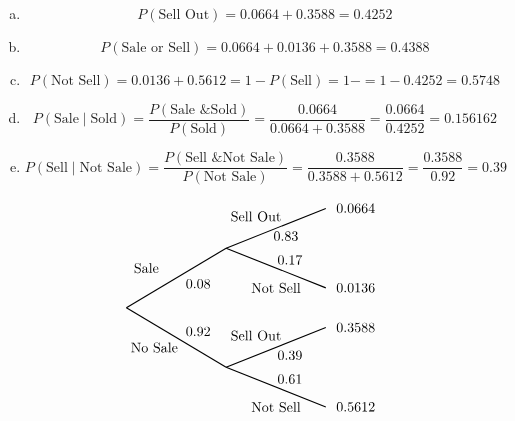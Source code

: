 \documentclass[11pt,letterpaper]{article}
\begin{document}
\sol 
\begin{enumerate}[(a)]
\item 
	\[
	P(\text{Sell Out})= 0.0664 + 0.3588= 0.4252
	\] \pspace

\item 
	\[
	P(\text{Sale or Sell})= 0.0664 + 0.0136 + 0.3588= 0.4388
	\] \pspace

\item 
	\[
	P(\text{Not Sell})= 0.0136 + 0.5612= 1 - P(\text{Sell})= 1 - = 1 - 0.4252= 0.5748
	\] \pspace

\item 
	\[
	P(\text{Sale} \;|\; \text{Sold})= \dfrac{P(\text{Sale \& Sold})}{P(\text{Sold})}= \dfrac{0.0664}{0.0664 + 0.3588}= \dfrac{0.0664}{0.4252}= 0.156162
	\] \pspace

\item 
	\[
	P(\text{Sell} \;|\; \text{Not Sale})= \dfrac{P(\text{Sell \& Not Sale})}{P(\text{Not Sale})}= \dfrac{0.3588}{0.3588 + 0.5612}= \dfrac{0.3588}{0.92}= 0.39
	\] 
\end{enumerate} \vfill

		\[
		\begin{tikzpicture}[scale= 1.0]
		\def\FirstUpLabel{Sale}
		\def\FirstDownLabel{No Sale}
		\def\SecondUpLabel{Sell Out}
		\def\SecondDownLabel{Not Sell}
		\def\Up{$0.08$}
		\def\Down{$0.92$}
		\def\UpUp{$0.83$}
		\def\UpDown{$0.17$}
		\def\DownUp{$0.39$}
		\def\DownDown{$0.61$}
		\def\first{$0.0664$}
		\def\second{$0.0136$}
		\def\third{$0.3588$}
		\def\fourth{$0.5612$}
		
		\node at (0.5,1) {\FirstUpLabel};	
		\node at (0.7,-1) {\FirstDownLabel};	
		\node at (1.8,0.6) {\Up};
		\node at (1.8,-0.6) {\Down};
		\draw[thick] (0,0) -- (2.5,1.5);
		\draw[thick] (0,0) -- (2.5,-1.5);
		
		\node at (3.25,2.3) {\SecondUpLabel};
		\node at (3.75,0.5) {\SecondDownLabel};
		\node at (4,1.8) {\UpUp};
		\node at (4.1,1.2) {\UpDown};
		\node at (5.75,2.5) {\first};
		\node at (5.75,0.5) {\second};
		\draw[thick] (2.5,1.5) -- (5,2.5);
		\draw[thick] (2.5,1.5) -- (5,0.5);

		\node at (3.25,-0.7) {\SecondUpLabel};
		\node at (3.75,-2.5) {\SecondDownLabel};
		\node at (4.1,-1.2) {\DownUp};
		\node at (4.1,-1.8) {\DownDown};
		\node at (5.75,-0.5) {\third};	
		\node at (5.75,-2.5) {\fourth};	
		\draw[thick] (2.5,-1.5) -- (5,-0.5);
		\draw[thick] (2.5,-1.5) -- (5,-2.5);
		\end{tikzpicture}
		\]
\end{document}
